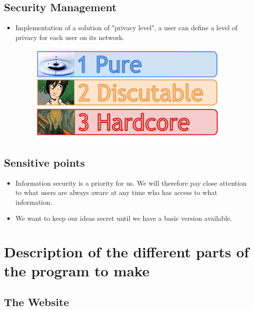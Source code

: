 \documentclass{life-fr}
\begin{document}
\section{Security Management}

\begin{itemize}
  \item Implementation of a solution of "privacy level", a user can define a level of privacy for each user on its network.

\begin{figure}[H]
  \begin{center}
    \includegraphics[width=10cm]{img/confidentialite.png}
  \end{center}
\end{figure}

\end{itemize}

\section{Sensitive points}

\begin{itemize}
  \item Information security is a priority for us. We will therefore pay close attention to what users are always aware at any time who has access to what information.
  \item We want to keep our ideas secret until we have a basic version available.
\end{itemize}

\chapter{Description of the different parts of the program to make}

\section{The Website}
\end{document}
